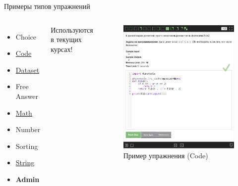 \documentclass{beamer}
\begin{document}
\begin{frame}{Примеры типов упражнений}
  \begin{columns}
    \begin{itemize}
    \item Choice
    \item \underline{Code}
    \item \underline{Dataset}
    \item Free Answer
    \item \underline{Math}
    \item Number
    \item Sorting
    \item \underline{String}
    \item \textbf{Admin}
    \end{itemize}
    Используются в текущих курсах!
    \begin{figure}
      \includegraphics[width=\textwidth]{../res/quiz.png}
      \caption{Пример упражнения (Code)}
    \end{figure}
  \end{columns}
\end{frame}
\end{document}
